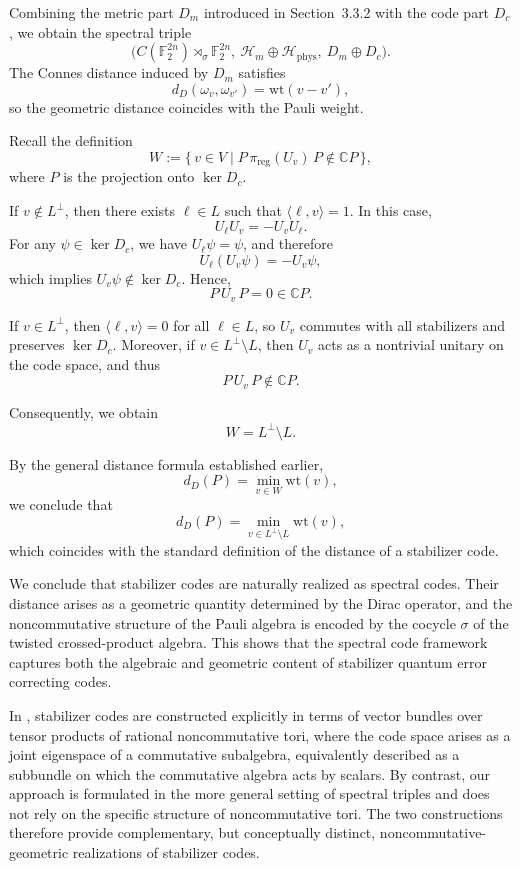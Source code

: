 \documentclass[12pt]{article}
\theoremstyle{definition} %
\theoremstyle{plain} %
\theoremstyle{remark} %
\theoremstyle{underline}
\begin{document}
Combining the metric part $D_m$ introduced in Section~3.3.2 with the code part $D_c$, we obtain the spectral triple
\[
    \bigl(
    C(\mathbb{F}_2^{2n})\rtimes_\sigma \mathbb{F}_2^{2n},\ 
    \mathcal{H}_m\oplus\mathcal{H}_{\mathrm{phys}},\ 
    D_m\oplus D_c
    \bigr).
\]
The Connes distance induced by $D_m$ satisfies
\[
    d_D(\omega_v,\omega_{v'})=\mathrm{wt}(v-v'),
\]
so the geometric distance coincides with the Pauli weight.

Recall the definition
\[
    W:=\{\,v\in V\mid P\,\pi_{\mathrm{reg}}(U_v)\,P\notin\mathbb{C}P\,\},
\]
where $P$ is the projection onto $\ker D_c$.

If $v\notin L^\perp$, then there exists $\ell\in L$ such that $\langle \ell,v\rangle=1$. In this case,
\[
 U_\ell U_v = - U_v U_\ell.
\]
For any $\psi\in\ker D_c$, we have $U_\ell\psi=\psi$, and therefore
\[
 U_\ell(U_v\psi)=-U_v\psi,
\]
which implies $U_v\psi\notin\ker D_c$. Hence,
\[
 P\,U_v\,P = 0 \in \mathbb{C}P.
\]

If $v\in L^\perp$, then $\langle \ell,v\rangle=0$ for all $\ell\in L$, so $U_v$ commutes with all stabilizers and preserves $\ker D_c$. Moreover, if $v\in L^\perp\setminus L$, then $U_v$ acts as a nontrivial unitary on the code space, and thus
\[
    P\,U_v\,P \notin \mathbb{C}P.
\]

Consequently, we obtain
\[
    W = L^\perp \setminus L.
\]

By the general distance formula established earlier,
\[
    d_D(P)=\min_{v\in W}\mathrm{wt}(v),
\]
we conclude that
\[
    d_D(P)=\min_{v\in L^\perp\setminus L}\mathrm{wt}(v),
\]
which coincides with the standard definition of the distance of a stabilizer
code.

We conclude that stabilizer codes are naturally realized as spectral codes.
Their distance arises as a geometric quantity determined by the Dirac operator,
and the noncommutative structure of the Pauli algebra is encoded by the cocycle
$\sigma$ of the twisted crossed-product algebra. This shows that the spectral code framework captures both the algebraic and geometric content of stabilizer quantum error correcting codes.

In \cite{marcolli2012codes}, stabilizer codes are constructed explicitly in terms of vector bundles over tensor products of rational noncommutative tori, where the code space arises as a joint eigenspace of a commutative subalgebra, equivalently described as a subbundle on which the commutative algebra acts by scalars.
By contrast, our approach is formulated in the more general setting of spectral triples and does not rely on the specific structure of noncommutative tori.
The two constructions therefore provide complementary, but conceptually distinct, noncommutative-geometric realizations of stabilizer codes.
\end{document}
